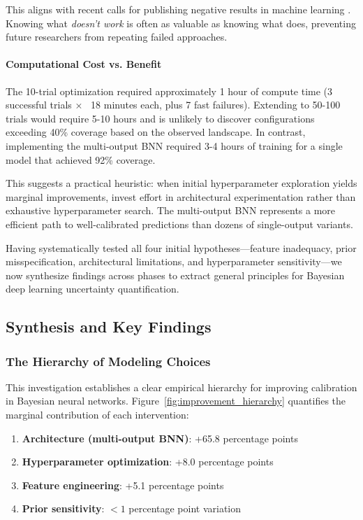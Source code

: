 This aligns with recent calls for publishing negative results in machine learning \citep{sculley2018winner}. Knowing what \textit{doesn't work} is often as valuable as knowing what does, preventing future researchers from repeating failed approaches.

\paragraph{Computational Cost vs. Benefit}

The 10-trial optimization required approximately 1 hour of compute time (3 successful trials × ~18 minutes each, plus 7 fast failures). Extending to 50-100 trials would require 5-10 hours and is unlikely to discover configurations exceeding 40\% coverage based on the observed landscape. In contrast, implementing the multi-output BNN required 3-4 hours of training for a single model that achieved 92\% coverage.

This suggests a practical heuristic: when initial hyperparameter exploration yields marginal improvements, invest effort in architectural experimentation rather than exhaustive hyperparameter search. The multi-output BNN represents a more efficient path to well-calibrated predictions than dozens of single-output variants.

Having systematically tested all four initial hypotheses—feature inadequacy, prior misspecification, architectural limitations, and hyperparameter sensitivity—we now synthesize findings across phases to extract general principles for Bayesian deep learning uncertainty quantification.

\subsection{Synthesis and Key Findings}
\label{subsec:synthesis}

\subsubsection{The Hierarchy of Modeling Choices}

This investigation establishes a clear empirical hierarchy for improving calibration in Bayesian neural networks. Figure~\ref{fig:improvement_hierarchy} quantifies the marginal contribution of each intervention:

\begin{enumerate}
    \item \textbf{Architecture (multi-output BNN)}: +65.8 percentage points
    \item \textbf{Hyperparameter optimization}: +8.0 percentage points
    \item \textbf{Feature engineering}: +5.1 percentage points
    \item \textbf{Prior sensitivity}: $<1$ percentage point variation
\end{enumerate}

